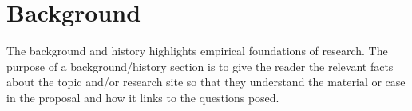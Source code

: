 \section{Background} \label{background}

The background and history highlights empirical foundations of research. The
purpose of a background/history section is to give the reader the relevant
facts about the topic and/or research site so that they understand the material
or case in the proposal and how it links to the questions posed.
